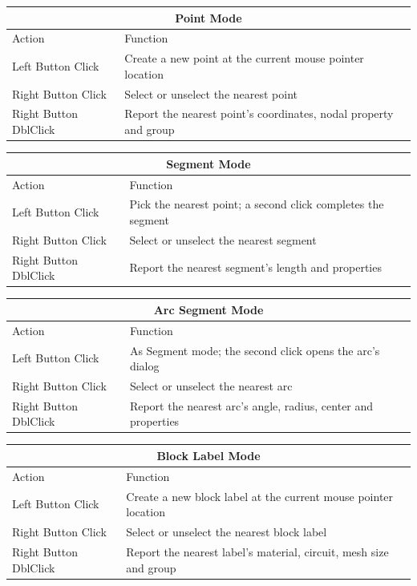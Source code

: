 \documentclass[12pt]{report}
\begin{document}
\begin{table}[ht]
\centering
\begin{tabular}{|l|l|} \hline \hline
\multicolumn{2}{|c|}{Point Mode} \\ \hline \hline
 Action    & Function \\ \hline \hline
 Left Button Click     & Create a new point at the current mouse pointer location \\ \hline
 Right Button Click    & Select or unselect the nearest point \\ \hline
 Right Button DblClick & Report the nearest point's coordinates, nodal property and group \\ \hline \hline
\end{tabular}

\vspace*{12pt}
\begin{tabular}{|l|l|} \hline \hline
\multicolumn{2}{|c|}{Segment Mode} \\ \hline \hline
 Action    & Function \\ \hline \hline
 Left Button Click     & Pick the nearest point; a second click completes the segment \\ \hline
 Right Button Click    & Select or unselect the nearest segment \\ \hline
 Right Button DblClick & Report the nearest segment's length and properties \\ \hline \hline
\end{tabular}

\vspace*{12pt}
\begin{tabular}{|l|l|} \hline \hline
\multicolumn{2}{|c|}{Arc Segment Mode} \\ \hline \hline
 Action    & Function \\ \hline \hline
 Left Button Click     & As Segment mode; the second click opens the arc's dialog \\ \hline
 Right Button Click    & Select or unselect the nearest arc \\ \hline
 Right Button DblClick & Report the nearest arc's angle, radius, center and properties \\ \hline \hline
\end{tabular}

\vspace*{12pt}
\begin{tabular}{|l|l|} \hline \hline
\multicolumn{2}{|c|}{Block Label Mode} \\ \hline \hline
 Action    & Function \\ \hline \hline
 Left Button Click     & Create a new block label at the current mouse pointer location \\ \hline
 Right Button Click    & Select or unselect the nearest block label \\ \hline
 Right Button DblClick & Report the nearest label's material, circuit, mesh size and group \\ \hline \hline
\end{tabular}


\end{table}
\end{document}
